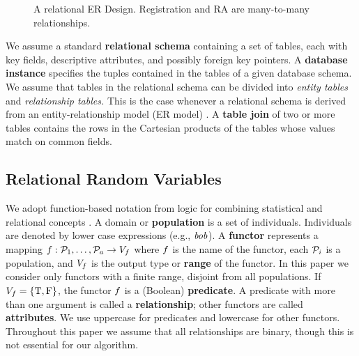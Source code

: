 \documentclass{sig-alternate-2013}
\begin{document}
\begin{figure}[htbp] %
 \centering
{} 
\caption{A relational ER Design. Registration and RA are many-to-many relationships.}
 \label{fig:university-schema}
\end{figure}
 We assume a standard \textbf{relational schema} containing a set of tables, each with key fields, %
descriptive attributes, and possibly foreign key pointers. 
A \textbf{database instance} specifies the tuples contained in the tables of a given database schema. 
We assume that tables in the relational schema can be divided into {\em entity tables} and {\em relationship tables.} 
This is the case whenever a relational schema is derived from an entity-relationship model (ER model) \cite[Ch.2.2]{Ullman1982}. A \textbf{table join} of two or more tables contains the rows in the Cartesian products of the tables whose values match on common fields.



\subsection{Relational Random Variables} \label{sec:variables}
We adopt function-based notation from logic for combining statistical and relational concepts \cite{Russell2010}.
A domain or \textbf{population} is a set of individuals.
Individuals are denoted by lower case expressions (e.g., $\it{bob}$). 
A \textbf{functor} represents a mapping
$f: \mathcal{P}_{1},\ldots,\mathcal{P}_{a} \rightarrow V_{f}$
where $f$ is the name of the functor, each $\mathcal{P}_{i}$ is a population, and $V_{f}$ is the output type or \textbf{range} of the functor. 
In this paper we consider only functors with a finite range, disjoint from all populations.  If $V_{f} = \{\mathrm{T},\mathrm{F}\}$, the functor $f$ is a (Boolean) \textbf{predicate}. A predicate with more than one argument is called a \textbf{relationship}; other functors are called \textbf{attributes}. We use uppercase for predicates and lowercase for other functors. Throughout this paper we assume that all relationships are binary, though this is not essential for our algorithm.
\end{document}

